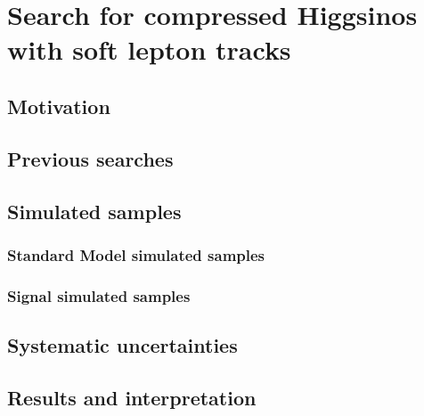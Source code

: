 \chapter{Search for compressed Higgsinos  with soft lepton tracks}

\section{Motivation}

\section{Previous searches}




\section{Simulated samples}
\subsection{Standard Model simulated samples}
\label{sec:sm-mc}
\subsection{Signal simulated samples}
\label{sec:signal-simulation}













\clearpage
\section{Systematic uncertainties}
\label{sec:systematic-uncertainties}



\clearpage
\section{Results and interpretation}


